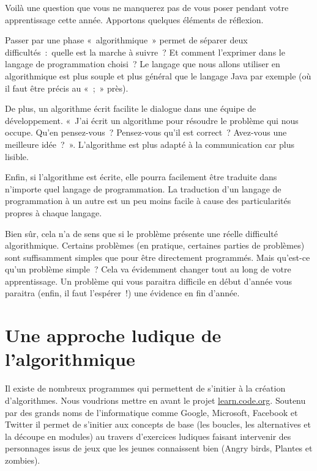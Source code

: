 	Voilà une question que vous ne manquerez pas de vous poser pendant votre
	apprentissage cette année. Apportons quelques éléments de réflexion.

	\begin{liste}
	\item
		Passer par une phase «~algorithmique~» permet de séparer deux 
		difficultés~:~quelle est la marche à suivre~? Et comment l’exprimer
		dans le langage de programmation choisi~? Le langage que nous allons
		utiliser en algorithmique est plus souple et plus général que le langage Java
		par exemple (où il faut être précis au «~;~» près).
	\item
		De plus, un algorithme écrit facilite le dialogue dans une équipe de
		développement. «~J’ai écrit un algorithme pour
		résoudre le problème qui nous occupe. Qu’en
		pensez-vous~? Pensez-vous qu’il est correct~?
		Avez-vous une meilleure idée~?~». L’algorithme est plus adapté à la
		communication car plus lisible.
	\item
		Enfin, si l'algorithme est écrite, elle pourra facilement être traduite
		dans n’importe quel langage de programmation. La
		traduction d’un langage de programmation à un autre
		est un peu moins facile à cause des particularités propres à chaque
		langage.
	\end{liste}

	Bien sûr, cela n’a de sens que si le problème présente
	une réelle difficulté algorithmique. Certains problèmes (en pratique,
	certaines parties de problèmes) sont suffisamment simples que pour être
	directement programmés. Mais qu’est-ce
	qu’un problème simple~? Cela va évidemment changer
	tout au long de votre apprentissage. Un problème qui vous paraitra
	difficile en début d’année vous paraitra (enfin, il
	faut l’espérer~!) une évidence en fin
	d’année.

\section{Une approche ludique de l'algorithmique}

	Il existe de nombreux programmes qui permettent de s'initier
	à la création d'algorithmes.
	Nous voudrions mettre en avant le projet \url{learn.code.org}.
	Soutenu par des grands noms de l'informatique comme 
	\textsf{Google}, \textsf{Microsoft}, \textsf{Facebook} et \textsf{Twitter}
	il permet de s'initier aux concepts de base
	(les boucles, les alternatives et la découpe en modules)
	au travers d'exercices ludiques faisant intervenir des
	personnages issus de jeux que les jeunes connaissent bien 
	(\textsf{Angry birds}, \textsf{Plantes et zombies}).
	

